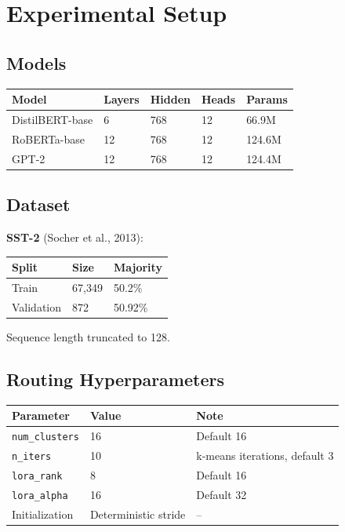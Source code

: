 
\section{Experimental Setup}

\subsection{Models}

\begin{table}[H]
\centering
\small
\begin{tabular}{lllll}
\toprule
\textbf{Model} & \textbf{Layers} & \textbf{Hidden} & \textbf{Heads} & \textbf{Params} \\
\midrule
DistilBERT-base & 6 & 768 & 12 & 66.9M \\
RoBERTa-base & 12 & 768 & 12 & 124.6M \\
GPT-2 & 12 & 768 & 12 & 124.4M \\
\bottomrule
\end{tabular}
\end{table}

\subsection{Dataset}

\textbf{SST-2} (Socher et al., 2013):

\begin{table}[H]
\centering
\small
\begin{tabular}{lll}
\toprule
\textbf{Split} & \textbf{Size} & \textbf{Majority} \\
\midrule
Train & 67,349 & 50.2\% \\
Validation & 872 & 50.92\% \\
\bottomrule
\end{tabular}
\end{table}

Sequence length truncated to 128.

\subsection{Routing Hyperparameters}

\begin{table}[H]
\centering
\small
\begin{tabular}{lll}
\toprule
\textbf{Parameter} & \textbf{Value} & \textbf{Note} \\
\midrule
\texttt{num\_clusters} & 16 & Default 16 \\
\texttt{n\_iters} & 10 & k-means iterations, default 3 \\
\texttt{lora\_rank} & 8 & Default 16 \\
\texttt{lora\_alpha} & 16 & Default 32 \\
Initialization & Deterministic stride & -- \\
\bottomrule
\end{tabular}
\end{table}

